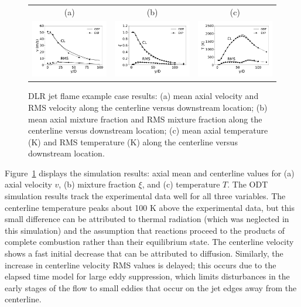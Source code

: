 \documentclass[preprint,12pt, a4paper]{elsarticle}
\begin{document}
\begin{figure}
	\begin{center}
		\begin{tabular}{ccc}
			(a) & (b) & (c) \\
            \includegraphics[width=1.7in]{fig_cl_uvel_DLR_test_11.pdf} &
            \includegraphics[width=1.7in]{fig_cl_mixf_DLR_test_11.pdf} &
            \includegraphics[width=1.7in]{fig_cl_temp_DLR_test_11.pdf}
		\end{tabular}
	\end{center}
	\caption{DLR jet flame example case results: (a) mean axial velocity and RMS velocity along the centerline versus downstream location; (b) mean axial mixture fraction and RMS mixture fraction along the centerline versus downstream location; (c) mean axial temperature (K) and RMS temperature (K) along the centerline versus downstream location.}
\label{fig:dlr_example_results}
\end{figure}

Figure~\ref{fig:dlr_example_results} displays the simulation results: axial mean and centerline values for (a) axial velocity $v$, (b) mixture fraction $\xi$, and (c) temperature $T$. The ODT simulation results track the experimental data well for all three variables. The centerline temperature peaks about 100 K above the experimental data, but this small difference can be attributed to thermal radiation (which was neglected in this simulation) and the assumption that reactions proceed to the products of complete combustion rather than their equilibrium state. The centerline velocity shows a fast initial decrease that can be attributed to diffusion. Similarly, the increase in centerline velocity RMS values is delayed; this occurs due to the elapsed time model for large eddy suppression, which limits disturbances in the early stages of the flow to small eddies that occur on the jet edges away from the centerline. 
\end{document}
